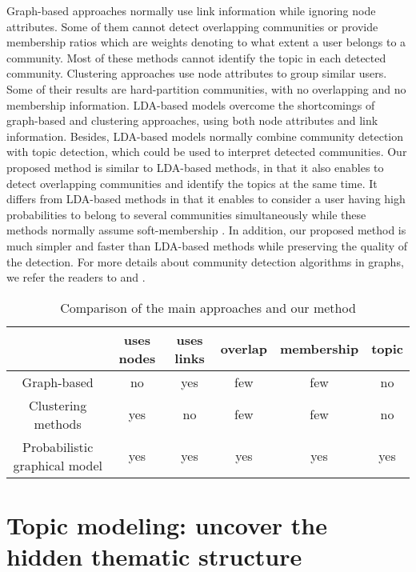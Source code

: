Graph-based approaches normally use link information while ignoring node attributes. Some of them cannot detect overlapping communities or provide membership ratios which are weights denoting to what extent a user belongs to a community. Most of these methods cannot identify the topic in each detected community. Clustering approaches use node attributes to group similar users. Some of their results are hard-partition communities, with no overlapping and no membership information. LDA-based models overcome the shortcomings of graph-based and clustering approaches, using both node attributes and link information. Besides, LDA-based models normally combine community detection with topic detection, which could be used to interpret detected communities. Our proposed method is similar to LDA-based methods, in that it also enables to detect overlapping communities and identify the topics at the same time. It differs from LDA-based methods in that it enables to consider a user having high probabilities to belong to several communities simultaneously while these methods normally assume soft-membership \cite{yang2013community}. In addition, our proposed method is much simpler and faster than LDA-based methods while preserving the quality of the detection.
For more details about community detection algorithms in graphs, we refer the readers to \cite{fortunato2010community} and \cite{DBLP:journals/csur/XieKS13}.
\begin{table}[htp]
\caption{Comparison of the main approaches and our method}
\label{tab:methodcomparison}
\centering
\begin{tabular}{|c|c|c|c|c|c|}
\hline
 &uses nodes &uses links & overlap & membership & topic\\
\hline
Graph-based & no & yes & few & few &no\\
\hline
Clustering methods & yes & no & few & few &no\\
\hline
Probabilistic graphical model& yes & yes & yes & yes &yes\\
\hline
\end{tabular}
\end{table}



\section{Topic modeling: uncover the hidden thematic structure}

